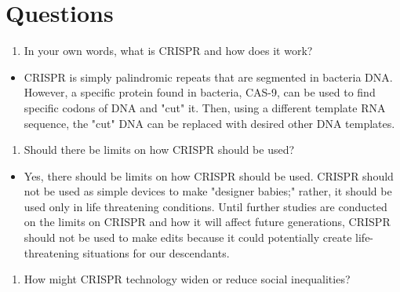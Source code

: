\documentclass[letterpaper]{article}
\def\tightlist{}
\newcommand{\titleDOC}{}
\newcommand{\authorDOC}{Daniel Sabalakov}
\newcommand{\classDOC}{}
\begin{document}








\renewcommand{\authorDOC}{Daniel Sabalakov}

\renewcommand{\classDOC}{DE Intro to Biotechnology I}

\renewcommand{\titleDOC}{CRISPR Documentary}



\section*{Questions}\label{questions}

\begin{enumerate}
\def\labelenumi{\arabic{enumi}.}
\tightlist
\item
  In your own words, what is CRISPR and how does it work?
\end{enumerate}

\begin{itemize}
\tightlist
\item
  CRISPR is simply palindromic repeats that are segmented in bacteria DNA. However, a specific protein found in bacteria, CAS-9, can be used to find specific codons of DNA and "cut" it. Then, using a different template RNA sequence, the "cut" DNA can be replaced with desired other DNA templates.
\end{itemize}

\begin{enumerate}
\def\labelenumi{\arabic{enumi}.}
\setcounter{enumi}{1}
\tightlist
\item
  Should there be limits on how CRISPR should be used?
\end{enumerate}

\begin{itemize}
\tightlist
\item
  Yes, there should be limits on how CRISPR should be used. CRISPR should not be used as simple devices to make "designer babies;" rather, it should be used only in life threatening conditions. Until further studies are conducted on the limits on CRISPR and how it will affect future generations, CRISPR should not be used to make edits because it could potentially create life-threatening situations for our descendants.
\end{itemize}

\begin{enumerate}
\def\labelenumi{\arabic{enumi}.}
\setcounter{enumi}{2}
\tightlist
\item
  How might CRISPR technology widen or reduce social inequalities?
\end{enumerate}
\end{document}
